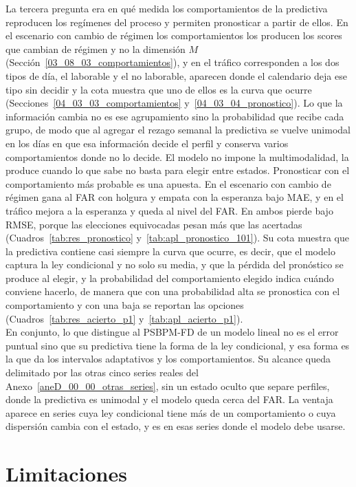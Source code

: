 La tercera pregunta era en qué medida los comportamientos de la predictiva reproducen los regímenes del proceso y permiten pronosticar a partir de ellos. En el escenario con cambio de régimen los comportamientos los producen los scores que cambian de régimen y no la dimensión $M$ (Sección~\ref{03_08_03_comportamientos}), y en el tráfico corresponden a los dos tipos de día, el laborable y el no laborable, aparecen donde el calendario deja ese tipo sin decidir y la cota muestra que uno de ellos es la curva que ocurre (Secciones~\ref{04_03_03_comportamientos} y~\ref{04_03_04_pronostico}). Lo que la información cambia no es ese agrupamiento sino la probabilidad que recibe cada grupo, de modo que al agregar el rezago semanal la predictiva se vuelve unimodal en los días en que esa información decide el perfil y conserva varios comportamientos donde no lo decide. El modelo no impone la multimodalidad, la produce cuando lo que sabe no basta para elegir entre estados. Pronosticar con el comportamiento más probable es una apuesta. En el escenario con cambio de régimen gana al FAR con holgura y empata con la esperanza bajo MAE, y en el tráfico mejora a la esperanza y queda al nivel del FAR. En ambos pierde bajo RMSE, porque las elecciones equivocadas pesan más que las acertadas (Cuadros~\ref{tab:res_pronostico} y~\ref{tab:apl_pronostico_101}). Su cota muestra que la predictiva contiene casi siempre la curva que ocurre, es decir, que el modelo captura la ley condicional y no solo su media, y que la pérdida del pronóstico se produce al elegir, y la probabilidad del comportamiento elegido indica cuándo conviene hacerlo, de manera que con una probabilidad alta se pronostica con el comportamiento y con una baja se reportan las opciones (Cuadros~\ref{tab:res_acierto_p1} y~\ref{tab:apl_acierto_p1}).\\

En conjunto, lo que distingue al PSBPM-FD de un modelo lineal no es el error puntual sino que su predictiva tiene la forma de la ley condicional, y esa forma es la que da los intervalos adaptativos y los comportamientos. Su alcance queda delimitado por las otras cinco series reales del Anexo~\ref{aneD_00_00_otras_series}, sin un estado oculto que separe perfiles, donde la predictiva es unimodal y el modelo queda cerca del FAR. La ventaja aparece en series cuya ley condicional tiene más de un comportamiento o cuya dispersión cambia con el estado, y es en esas series donde el modelo debe usarse.

\section{Limitaciones}
\label{05_02_00_limitaciones}

